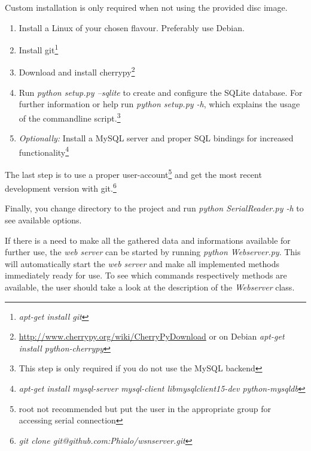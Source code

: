 Custom installation is only required when not using the provided disc image.

\begin{enumerate}
    \item Install a Linux of your chosen flavour. Preferably use Debian.
    \item Install git\footnote{\textit{apt-get install git}}
    \item Download and install cherrypy\footnote{\url{http://www.cherrypy.org/wiki/CherryPyDownload} or on Debian \textit{apt-get install python-cherrypy}}
    \item Run \textit{python setup.py --sqlite} to create and configure the SQLite database. For further information or help run \textit{python setup.py -h}, which explains the usage of the commandline script.\footnote{This step is only required if you do not use the MySQL backend}
    \item \textit{Optionally:} Install a MySQL server and proper SQL bindings for increased functionality\footnote{\textit{apt-get install mysql-server mysql-client libmysqlclient15-dev python-mysqldb}}
\end{enumerate}

The last step is to use a proper user-account\footnote{root not recommended but put the user in the appropriate group for accessing serial connection} and
get the most recent development version with git.\footnote{\textit{git clone git@github.com:Phialo/wsnserver.git}}

Finally, you change directory to the project and run \textit{python SerialReader.py -h} to see available options.

If there is a need to make all the gathered data and informations available for further use, the \textit{web server} can be started by running \textit{python Webserver.py}. This will automatically start the 
\textit{web server} and make all implemented methods immediately ready for use. To see which commands respectively methods are available, the user should take a look at the description of the \textit{Webserver} class.
